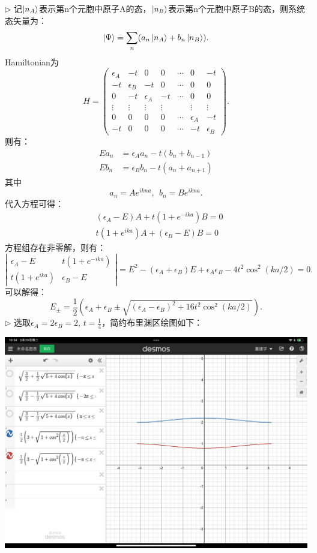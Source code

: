 \documentclass[reqno,a4paper,12pt]{amsart}
\begin{document}
\begin{tcolorbox}[breakable, colback = black!5!white, colframe = black]
$\triangleright$ 记$\ket{n_A}$表示第n个元胞中原子A的态，$\ket{n_B}$表示第n个元胞中原子B的态，则系统态矢量为：
\[
	\ket{\Psi} = \sum_{n} (a_n\ket{n_A} + b_n\ket{n_B}).
\]
Hamiltonian为
\[
	H = \begin{pmatrix}
		\epsilon_A & -t & 0 & 0 & \cdots & 0 & -t \\
		-t & \epsilon_B & -t & 0 & \cdots & 0 & 0 \\
		0 & -t & \epsilon_A & -t & \cdots & 0 & 0 \\
		\vdots & \vdots & \vdots & \vdots & & \vdots & \vdots \\
		0 & 0 & 0 & 0 & \cdots & \epsilon_A & -t \\
		-t & 0 & 0 & 0 & \cdots & -t & \epsilon_B
	\end{pmatrix}.
\]
则有：
\begin{align*}
	Ea_n &= \epsilon_A a_n - t(b_n+b_{n-1}) \\
	Eb_n &= \epsilon_B b_n - t(a_n+a_{n+1})
\end{align*}
其中
\[
	a_n = Ae^{ikna}, ~~ b_n = Be^{ikna}.
\]
代入方程可得：
\begin{align*}
	&(\epsilon_A - E) A + t(1+e^{-ika})B = 0 \\
	&t(1+e^{ika}) A + (\epsilon_B - E) B = 0
\end{align*}
方程组存在非零解，则有：
\[
	\left\vert \begin{matrix}
		\epsilon_A - E & t(1+e^{-ika}) \\
		t(1+e^{ika}) & \epsilon_B - E 
	\end{matrix}\right\vert = E^2-(\epsilon_A+\epsilon_B)E + \epsilon_A\epsilon_B - 4t^2\cos^2(ka/2) = 0.
\]
可以解得：
\[
	E_{\pm} = \frac{1}{2}(\epsilon_A+\epsilon_B \pm \sqrt{(\epsilon_A-\epsilon_B)^2+16t^2\cos^2(ka/2)}).
\]
$\triangleright$ 选取$\epsilon_A = 2\epsilon_B = 2$, $t = \frac{1}{4}$，简约布里渊区绘图如下： \\
\begin{centering}
	\includegraphics[scale=0.11]{reduced11.2.jpg}

\end{centering}
\end{tcolorbox}
\end{document}
